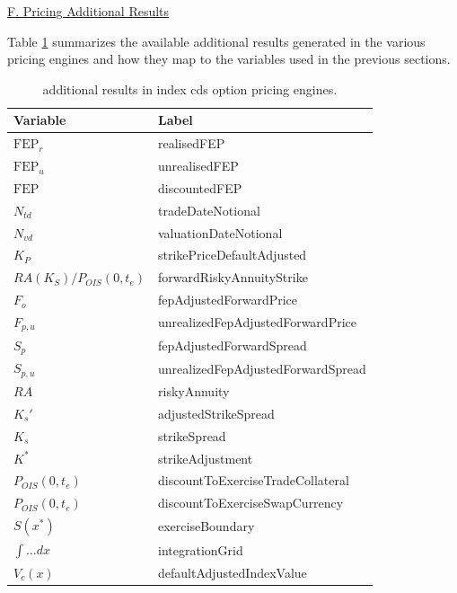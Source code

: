 \underline{F. Pricing Additional Results}

Table \ref{tab:cr_indexcdsoption_addresults} summarizes the available additional results generated in the various
pricing engines and how they map to the variables used in the previous sections.

\begin{table}[hbt]
  \begin{tabular}{|l|l|}
    \hline
    Variable & Label \\
    \hline
    $\text{FEP}_r$             & realisedFEP \\
    $\text{FEP}_u$             & unrealisedFEP \\
    $\text{FEP}$               & discountedFEP \\
    $N_{td}$                   & tradeDateNotional \\
    $N_{vd}$                   & valuationDateNotional \\
    $K_P$                      & strikePriceDefaultAdjusted \\
    $RA(K_S)/P_{OIS}(0,t_e)$   & forwardRiskyAnnuityStrike \\
    $F_o$                     & fepAdjustedForwardPrice \\
    $F_{p,u}$                  & unrealizedFepAdjustedForwardPrice \\
    $S_p$                     & fepAdjustedForwardSpread \\
    $S_{p,u}$                  & unrealizedFepAdjustedForwardSpread \\
    $RA$                      & riskyAnnuity \\
    $K_s'$                    & adjustedStrikeSpread \\
    $K_s$                     & strikeSpread \\
    $K^*$                     & strikeAdjustment \\
    $P_{OIS}(0,t_e)$           & discountToExerciseTradeCollateral \\
    $P_{OIS}(0,t_e)$           & discountToExerciseSwapCurrency \\
    $S(x^*)$                  & exerciseBoundary \\
    $\int \ldots dx$          & integrationGrid \\
    $V_c(x)$                  & defaultAdjustedIndexValue \\
    \hline
  \end{tabular}
  \caption{additional results in index cds option pricing engines.}
  \label{tab:cr_indexcdsoption_addresults}
\end{table}

